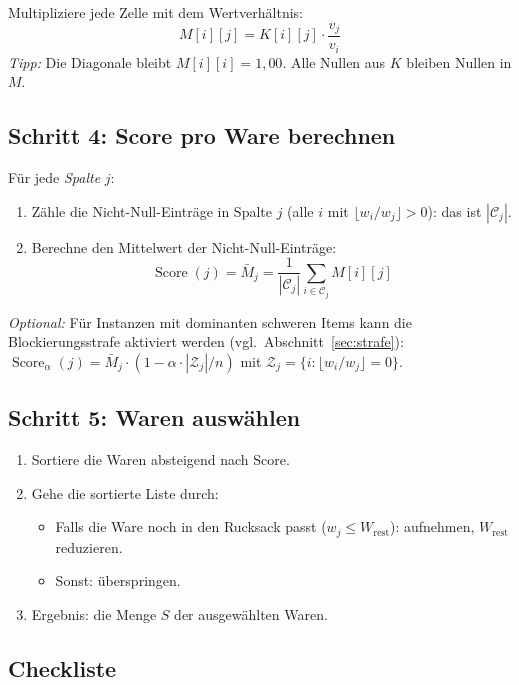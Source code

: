 \documentclass[a4paper,11pt]{article}
\begin{document}
\begin{appendices}
Multipliziere jede Zelle mit dem Wertverhältnis:
\[
M[i][j] = K[i][j] \cdot \frac{v_j}{v_i}
\]
\textit{Tipp:} Die Diagonale bleibt $M[i][i] = 1{,}00$.
Alle Nullen aus $K$ bleiben Nullen in $M$.

\subsection*{Schritt 4: Score pro Ware berechnen}

Für jede \emph{Spalte} $j$:
\begin{enumerate}[topsep=2pt]
  \item Zähle die Nicht-Null-Einträge in Spalte $j$
    (alle $i$ mit $\lfloor w_i/w_j \rfloor > 0$):
    das ist $|\mathcal{C}_j|$.
  \item Berechne den Mittelwert der Nicht-Null-Einträge:
    \[
    \operatorname{Score}(j) = \bar{M}_j = \frac{1}{|\mathcal{C}_j|}
    \sum_{i \in \mathcal{C}_j} M[i][j]
    \]
\end{enumerate}

\noindent
\textit{Optional:} Für Instanzen mit dominanten schweren Items
kann die Blockierungsstrafe aktiviert werden
(vgl.\ Abschnitt~\ref{sec:strafe}):
$\operatorname{Score}_\alpha(j) = \bar{M}_j \cdot
(1 - \alpha \cdot |\mathcal{Z}_j|/n)$
mit $\mathcal{Z}_j = \{i : \lfloor w_i/w_j \rfloor = 0\}$.

\subsection*{Schritt 5: Waren auswählen}

\begin{enumerate}[topsep=2pt]
  \item Sortiere die Waren absteigend nach Score.
  \item Gehe die sortierte Liste durch:
    \begin{itemize}[topsep=2pt]
      \item Falls die Ware noch in den Rucksack passt
        ($w_j \le W_{\text{rest}}$): aufnehmen,
        $W_{\text{rest}}$ reduzieren.
      \item Sonst: überspringen.
    \end{itemize}
  \item Ergebnis: die Menge $S$ der ausgewählten Waren.
\end{enumerate}

\subsection*{Checkliste}


\end{appendices}
\end{document}
